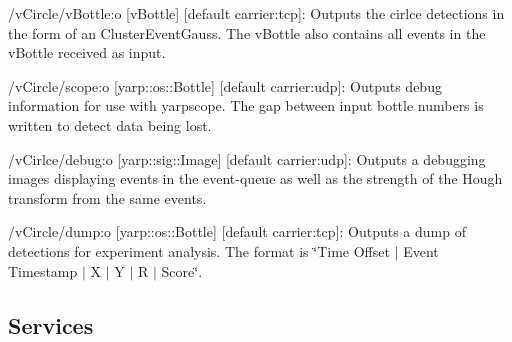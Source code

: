 \begin{DoxyItemize}
\item /v\+Circle/v\+Bottle\+:o \mbox{[}v\+Bottle\mbox{]} \mbox{[}default carrier\+:tcp\mbox{]}\+: Outputs the cirlce detections in the form of an Cluster\+Event\+Gauss. The v\+Bottle also contains all events in the v\+Bottle received as input.
\item /v\+Circle/scope\+:o \mbox{[}yarp\+::os\+::\+Bottle\mbox{]} \mbox{[}default carrier\+:udp\mbox{]}\+: Outputs debug information for use with yarpscope. The gap between input bottle numbers is written to detect data being lost.
\item /v\+Cirlce/debug\+:o \mbox{[}yarp\+::sig\+::\+Image\mbox{]} \mbox{[}default carrier\+:udp\mbox{]}\+: Outputs a debugging images displaying events in the event-\/queue as well as the strength of the Hough transform from the same events.
\item /v\+Circle/dump\+:o \mbox{[}yarp\+::os\+::\+Bottle\mbox{]} \mbox{[}default carrier\+:tcp\mbox{]}\+: Outputs a dump of detections for experiment analysis. The format is \char`\"{}\+Time Offset $\vert$ Event Timestamp $\vert$ X $\vert$ Y $\vert$ R $\vert$ Score\char`\"{}.
\end{DoxyItemize}\hypertarget{group__zynqGrabber_services_sec}{}\subsection{Services}\label{group__zynqGrabber_services_sec}
